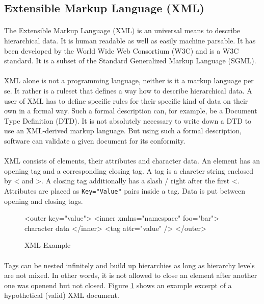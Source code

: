 \subsection{Extensible Markup Language (XML)}
\paragraph{}
The Extensible Markup Language (XML) is an universal means to describe hierarchical data. It is human readable as well as easily machine parsable. It has been developed by the World Wide Web Consortium (W3C) and is a W3C standard. It is a subset of the Standard Generalized Markup Language (SGML).

\paragraph{}
XML alone is not a programming language, neither is it a markup language per se. It rather is a ruleset that defines a way how to describe hierarchical data. A user of XML has to define specific rules for their specific kind of data on their own in a formal way. Such a formal description can, for example, be a Document Type Definition (DTD). It is not absolutely necessary to write down a DTD to use an XML-derived markup language. But using such a formal description, software can validate a given document for its conformity.

\paragraph{}
XML consists of elements, their attributes and character data. An element has an opening tag and a corresponding closing tag. A tag is a charcter string enclosed by \glqq{}<\grqq{} and \glqq{}>\grqq{}. A closing tag additionally has a slash \glqq{}/\grqq{} right after the first \glqq{}<\grqq{}. Attributes are placed as \texttt{Key="Value"} pairs inside a tag. Data is put between opening and closing tags.

\begin{figure}[H]
\begin{listing}{1}
<outer key="value">
  <inner xmlns="namespace" foo="bar">
    character data
  </inner>
  <tag attr="value" />
</outer>
\end{listing}
\caption{XML Example}
\label{fig:XMLexample}
\end{figure}

\paragraph{}
Tags can be nested infinitely and build up hierarchies as long as hierarchy levels are not mixed. In other words, it is not allowed to close an element after another one was openend but not closed. Figure \ref{fig:XMLexample} shows an example excerpt of a hypothetical (valid) XML document.

